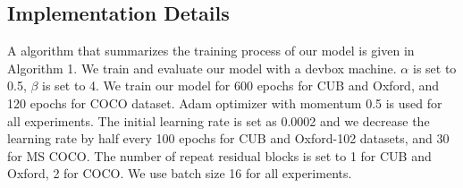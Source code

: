 \documentclass[10pt,twocolumn,letterpaper]{article}
\begin{document}
\subsection{Implementation Details}
A algorithm that summarizes the training process of our model is given in Algorithm 1. We train and evaluate our model with a devbox machine. $\alpha$ is set to 0.5, $\beta$ is set to 4. We train our model for 600 epochs for CUB and Oxford, and 120 epochs for COCO dataset. Adam optimizer with momentum 0.5 is used for all experiments.  The initial learning rate is set as 0.0002 and we decrease the learning rate by half every 100 epochs for CUB and Oxford-102 datasets, and 30 for MS COCO.
The number of repeat residual blocks is set to 1 for CUB and Oxford, 2 for COCO. We use batch size 16 for all experiments. 

\end{document}
